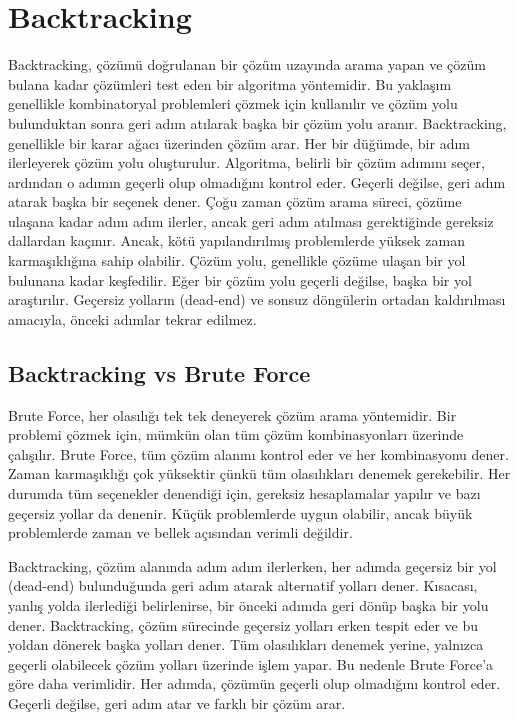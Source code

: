 \section{Backtracking}

Backtracking, çözümü doğrulanan bir çözüm uzayında arama yapan ve çözüm bulana kadar çözümleri test eden bir algoritma yöntemidir. Bu yaklaşım genellikle kombinatoryal problemleri çözmek için kullanılır ve çözüm yolu bulunduktan sonra geri adım atılarak başka bir çözüm yolu aranır. Backtracking, genellikle bir karar ağacı üzerinden çözüm arar. Her bir düğümde, bir adım ilerleyerek çözüm yolu oluşturulur. Algoritma, belirli bir çözüm adımını seçer, ardından o adımın geçerli olup olmadığını kontrol eder. Geçerli değilse, geri adım atarak başka bir seçenek dener. Çoğu zaman çözüm arama süreci, çözüme ulaşana kadar adım adım ilerler, ancak geri adım atılması gerektiğinde gereksiz dallardan kaçınır. Ancak, kötü yapılandırılmış problemlerde yüksek zaman karmaşıklığına sahip olabilir. Çözüm yolu, genellikle çözüme ulaşan bir yol bulunana kadar keşfedilir. Eğer bir çözüm yolu geçerli değilse, başka bir yol araştırılır.  Geçersiz yolların (dead-end) ve sonsuz döngülerin ortadan kaldırılması amacıyla, önceki adımlar tekrar edilmez.

\subsection{Backtracking vs Brute Force}

Brute Force, her olasılığı tek tek deneyerek çözüm arama yöntemidir. Bir problemi çözmek için, mümkün olan tüm çözüm kombinasyonları üzerinde çalışılır. Brute Force, tüm çözüm alanını kontrol eder ve her kombinasyonu dener. Zaman karmaşıklığı çok yüksektir çünkü tüm olasılıkları denemek gerekebilir. Her durumda tüm seçenekler denendiği için, gereksiz hesaplamalar yapılır ve bazı geçersiz yollar da denenir. Küçük problemlerde uygun olabilir, ancak büyük problemlerde zaman ve bellek açısından verimli değildir.

Backtracking, çözüm alanında adım adım ilerlerken, her adımda geçersiz bir yol (dead-end) bulunduğunda geri adım atarak alternatif yolları dener. Kısacası, yanlış yolda ilerlediği belirlenirse, bir önceki adımda geri dönüp başka bir yolu dener. Backtracking, çözüm sürecinde geçersiz yolları erken tespit eder ve bu yoldan dönerek başka yolları dener. Tüm olasılıkları denemek yerine, yalnızca geçerli olabilecek çözüm yolları üzerinde işlem yapar. Bu nedenle Brute Force'a göre daha verimlidir. Her adımda, çözümün geçerli olup olmadığını kontrol eder. Geçerli değilse, geri adım atar ve farklı bir çözüm arar.

